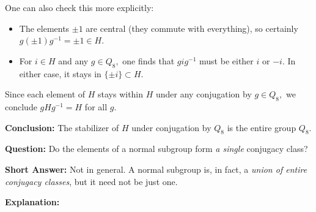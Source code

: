 \documentclass[12pt]{article}
\theoremstyle{definition} %
\theoremstyle{plain} %
\begin{document}
One can also check this more explicitly:

\begin{itemize}
    \item The elements $\pm 1$ are central (they commute with everything), so certainly $g (\pm 1) g^{-1} = \pm 1 \in H$.
    \item For $i \in H$ and any $g \in Q_8,$ one finds that $g i g^{-1}$ must be either $i$ or $-i$. In either case, it stays in $\{\pm i\} \subset H$.
\end{itemize}
Since each element of $H$ stays within $H$ under any conjugation by $g \in Q_8,$ we conclude $g H g^{-1} = H$ for all $g$.

\bigskip

\noindent
\textbf{Conclusion:} The stabilizer of $H$ under conjugation by $Q_8$ is the entire group $Q_8$.

\noindent
\textbf{Question:} Do the elements of a normal subgroup form \emph{a single} conjugacy class?

\bigskip

\noindent
\textbf{Short Answer:} Not in general. A normal subgroup is, in fact, a \emph{union of entire conjugacy classes}, but it need not be just one. 

\bigskip

\noindent
\textbf{Explanation:}
\end{document}
